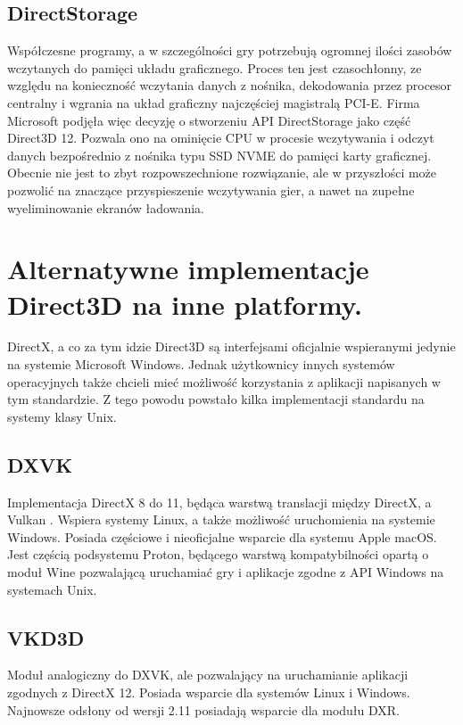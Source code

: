 \subsection{DirectStorage}
Współczesne programy, a w szczególności gry potrzebują ogromnej ilości
zasobów wczytanych do pamięci układu graficznego. Proces ten jest
czasochłonny, ze względu na konieczność wczytania danych z nośnika,
dekodowania przez procesor centralny i wgrania na układ graficzny
najczęściej magistralą PCI-E. Firma Microsoft podjęła więc decyzję o stworzeniu API DirectStorage jako
część Direct3D 12. Pozwala ono na ominięcie CPU w procesie wczytywania i
odczyt danych bezpośrednio z nośnika typu SSD NVME do pamięci karty
graficznej. Obecnie nie jest to zbyt rozpowszechnione rozwiązanie, ale w
przyszłości może pozwolić na znaczące przyspieszenie wczytywania gier, a
nawet na zupełne wyeliminowanie ekranów ładowania.

\section{Alternatywne implementacje Direct3D na inne platformy.} %

DirectX, a co za tym idzie Direct3D są interfejsami oficjalnie
wspieranymi jedynie na systemie Microsoft Windows. Jednak użytkownicy
innych systemów operacyjnych także chcieli mieć możliwość korzystania z
aplikacji napisanych w tym standardzie. Z tego powodu powstało kilka
implementacji standardu na systemy klasy Unix.

\subsection{DXVK}
Implementacja DirectX 8 do 11, będąca warstwą translacji między DirectX,
a Vulkan \cite{github:dxvk:2024}. Wspiera systemy Linux, a także możliwość uruchomienia
na systemie Windows. Posiada częściowe i nieoficjalne wsparcie dla
systemu Apple macOS. Jest częścią podsystemu Proton, będącego warstwą
kompatybilności opartą o moduł Wine pozwalającą uruchamiać gry i
aplikacje zgodne z API Windows na systemach Unix.

\subsection{VKD3D}
Moduł analogiczny do DXVK, ale pozwalający na uruchamianie aplikacji
zgodnych z DirectX 12. Posiada wsparcie dla systemów Linux i Windows. Najnowsze odsłony od wersji 2.11 posiadają wsparcie dla modułu DXR.